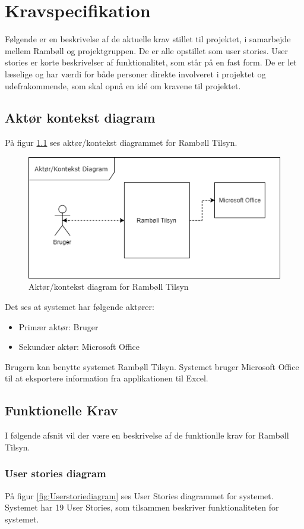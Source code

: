 \chapter{Kravspecifikation}

Følgende er en beskrivelse af de aktuelle krav stillet til projektet, i samarbejde mellem Rambøll og projektgruppen. De er alle opstillet som user stories. User stories er korte beskrivelser af funktionalitet, som står på en fast form. De er let læselige og har værdi for både personer direkte involveret i projektet og udefrakommende, som skal opnå en idé om kravene til projektet. 

\section{Aktør kontekst diagram}\label{sec:Aktor}
	På figur \ref{fig:AktorKontekst} ses aktør/kontekst diagrammet for Rambøll Tilsyn. 
\begin{figure}[H]
	\centering
	\includegraphics[width=0.6\linewidth]{FunktionelleKrav/AktorDiagram}
	\caption{Aktør/kontekst diagram for Rambøll Tilsyn}
	\label{fig:AktorKontekst}
\end{figure}
Det ses at systemet har følgende aktører:
\begin{itemize}
	\item Primær aktør: Bruger
	\item Sekundær aktør: Microsoft Office \\
\end{itemize}

Brugern kan benytte systemet Rambøll Tilsyn. Systemet bruger Microsoft Office til at eksportere information fra applikationen til Excel.

\clearpage

\section{Funktionelle Krav} \label{sec:UserStories}
I følgende afsnit vil der være en beskrivelse af de funktionlle krav for Rambøll Tilsyn.

\subsection{User stories diagram}
På figur \ref{fig:Userstoriediagram} ses User Stories diagrammet for systemet. Systemet har 19 User Stories, som tilsammen beskriver funktionaliteten for systemet. \\

